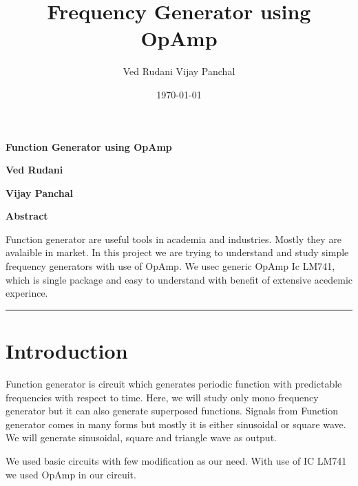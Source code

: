 \documentclass{article}
\author{Ved Rudani Vijay Panchal}
\date{\today}
\title{Frequency Generator using OpAmp}
\begin{document}
\maketitle
\tableofcontents

\pagebreak

\begin{center}
\Large
\textbf{Function Generator using OpAmp}


\vspace{0.9cm}
\normalsize
\textbf{Ved Rudani}


\textbf{Vijay Panchal}


\vspace{1.5cm}


\colorbox{bg1}{
\begin{minipage}{1\textwidth}\centering
        \vspace{1.5cm}
        \Large
        \textbf{Abstract}

        \begin{minipage}{0.7\textwidth}
        \vspace{.8cm}
        \normalsize
        Function generator are useful tools in academia and industries. Mostly they are avalaible in market. In this project we are trying to understand and study simple frequency generators with use of OpAmp. We usec generic OpAmp Ic LM741, which is single package and easy to understand with benefit of extensive acedemic experince.
        \vspace{1.5cm}
        \end{minipage}

\end{minipage}}

\vspace{1.5cm}
\noindent
\color{grey} \rule{\linewidth}{0.5mm}
\end{center}



\section{Introduction}
\label{sec:org78ed879}
Function generator is circuit which generates periodic function with predictable frequencies with respect to time. Here, we will study only mono frequency generator but it can also generate superposed functions. Signals from Function generator comes in many forms but mostly it is either sinusoidal or square wave. We will generate sinusoidal, square and triangle wave as output. 

We used basic circuits with few modification as our need. With use of IC LM741 we used OpAmp in our circuit. 
\end{document}
